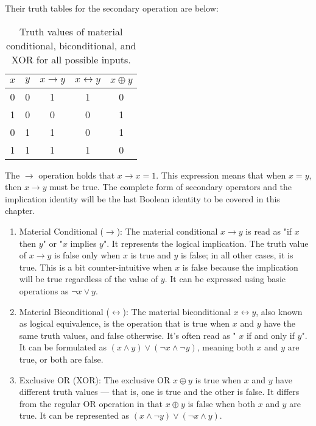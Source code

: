         Their truth tables for the secondary operation are below:
        \begin{table}[H]
        \centering
        \begin{tabular}{cc|c|c|c}
        \hline
        \( x \) & \( y \) & \( x \rightarrow y \) & \( x \leftrightarrow y \) & \( x \oplus y \) \\
        \hline
        0 & 0 & 1 & 1 & 0 \\
        1 & 0 & 0 & 0 & 1 \\
        0 & 1 & 1 & 0 & 1 \\
        1 & 1 & 1 & 1 & 0 \\
        \hline
        \end{tabular}
        \caption{Truth values of material conditional, biconditional, and XOR for all possible inputs.}
        \end{table}
        The $\rightarrow$ operation holds that $x \rightarrow x = 1$. This expression means
        that when $x=y$, then $x\rightarrow y$ must be true. The complete form of secondary operators
        and the implication identity will be the last Boolean identity to be covered in this chapter.
        \begin{enumerate}
            \item Material Conditional (\(\rightarrow\)):
            The material conditional \( x \rightarrow y \) is read as "if \( x \) then \( y \)" or "\( x \) implies \( y \)". It represents the logical implication. The truth value of \( x \rightarrow y \) is false only when \( x \) is true and \( y \) is false; in all other cases, it is true. This is a bit counter-intuitive when \( x \) is false because the implication will be true regardless of the value of \( y \). It can be expressed using basic operations as \( \lnot x \lor y \).
            
            \item Material Biconditional (\(\leftrightarrow\)):
            The material biconditional \( x \leftrightarrow y \), also known as logical equivalence, is the operation that is true when \( x \) and \( y \) have the same truth values, and false otherwise. It's often read as " \( x \) if and only if \( y \)". It can be formulated as \( (x \land y) \lor (\lnot x \land \lnot y) \), meaning both \( x \) and \( y \) are true, or both are false.
            
            \item Exclusive OR (XOR):
            The exclusive OR \( x \oplus y \) is true when \( x \) and \( y \) have different truth values — that is, one is true and the other is false. It differs from the regular OR operation in that \( x \oplus y \) is false when both \( x \) and \( y \) are true. It can be represented as \( (x \land \lnot y) \lor (\lnot x \land y) \).
        \end{enumerate}
        
